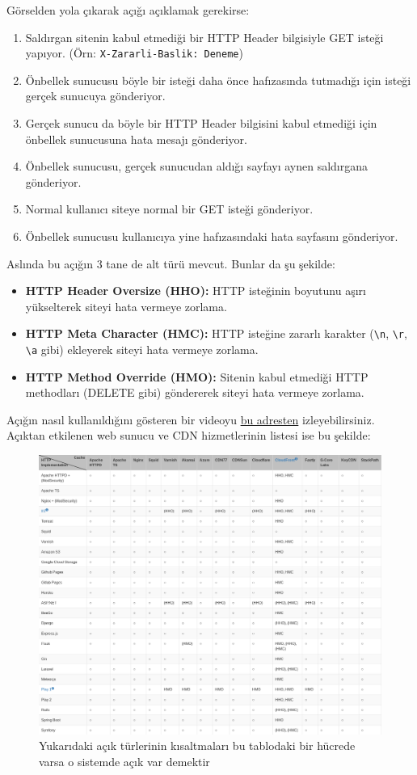\documentclass[11pt]{article}
\begin{document}
Görselden yola çıkarak açığı açıklamak gerekirse:
\begin{enumerate}
\item Saldırgan sitenin kabul etmediği bir HTTP Header bilgisiyle GET isteği
yapıyor. (Örn: \texttt{X-Zararli-Baslik: Deneme})
\item Önbellek sunucusu böyle bir isteği daha önce hafızasında tutmadığı için
isteği gerçek sunucuya gönderiyor.
\item Gerçek sunucu da böyle bir HTTP Header bilgisini kabul etmediği için
önbellek sunucusuna hata mesajı gönderiyor.
\item Önbellek sunucusu, gerçek sunucudan aldığı sayfayı aynen saldırgana
gönderiyor.
\item Normal kullanıcı siteye normal bir GET isteği gönderiyor.
\item Önbellek sunucusu kullanıcıya yine hafızasındaki hata sayfasını
gönderiyor.
\end{enumerate}

Aslında bu açığın 3 tane de alt türü mevcut. Bunlar da şu şekilde:
\begin{itemize}
\item \textbf{HTTP Header Oversize (HHO):} HTTP isteğinin boyutunu aşırı yükselterek
siteyi hata vermeye zorlama.
\item \textbf{HTTP Meta Character (HMC):} HTTP isteğine zararlı karakter (\texttt{\textbackslash{}n},
\texttt{\textbackslash{}r}, \texttt{\textbackslash{}a} gibi) ekleyerek siteyi hata vermeye zorlama.
\item \textbf{HTTP Method Override (HMO):} Sitenin kabul etmediği HTTP methodları
(DELETE gibi) göndererek siteyi hata vermeye zorlama.
\end{itemize}

Açığın nasıl kullanıldığını gösteren bir videoyu \href{https://www.youtube.com/watch?v=c4-1UaEEwI8}{bu adresten} izleyebilirsiniz.
Açıktan etkilenen web sunucu ve CDN hizmetlerinin listesi ise bu şekilde:

\begin{figure}[htbp]
\centering
\includegraphics[width=.9\linewidth]{gorseller/cpdos-etkileri.png}
\caption{Yukarıdaki açık türlerinin kısaltmaları bu tablodaki bir hücrede varsa o sistemde açık var demektir}
\end{figure}
\end{document}
